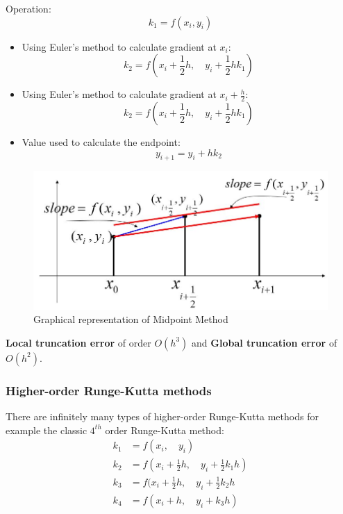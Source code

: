 \documentclass[10pt,a4paper]{article}
\begin{document}
Operation:
$$
    k_1 = f(x_i,y_i)
$$
\begin{itemize}
    \item Using Euler's method to calculate gradient at $x_i$:
    $$
        k_2=f(x_i+\frac{1}{2}h, \quad y_i+\frac{1}{2}hk_1)
    $$
    \item Using Euler's method to calculate gradient at $x_i + \frac{h}{2}$:
    $$
        k_2 = f(x_i + \frac{1}{2}h, \quad y_i+\frac{1}{2}hk_1)
    $$
    \item Value used to calculate the endpoint:
    $$
        y_{i+1} = y_i + hk_2
    $$
\end{itemize}

\begin{figure} [h!]
    \centering
    \includegraphics[scale=0.5]{Numerical.JPG}
    \caption{Graphical representation of Midpoint Method}
\end{figure}

\textbf{Local truncation error} of order $O(h^3)$ and \textbf{Global truncation error} of $O(h^2)$.

\subsubsection{Higher-order Runge-Kutta methods}

There are infinitely many types of higher-order Runge-Kutta methods for example the classic $4^{th}$
order Runge-Kutta method:
\begin{equation*}
    \begin{aligned}
        k_1 &= f(x_i,\quad y_i) \\
        k_2 &= f(x_i+\frac{1}{2}h, \quad y_i+\frac{1}{2}k_1h) \\
        k_3 &= f(x_i+\frac{1}{2}h, \quad y_i+\frac{1}{2}k_2h \\
        k_4 &= f(x_i+h, \quad y_i+k_3h)
    \end{aligned}
\end{equation*}
\end{document}
